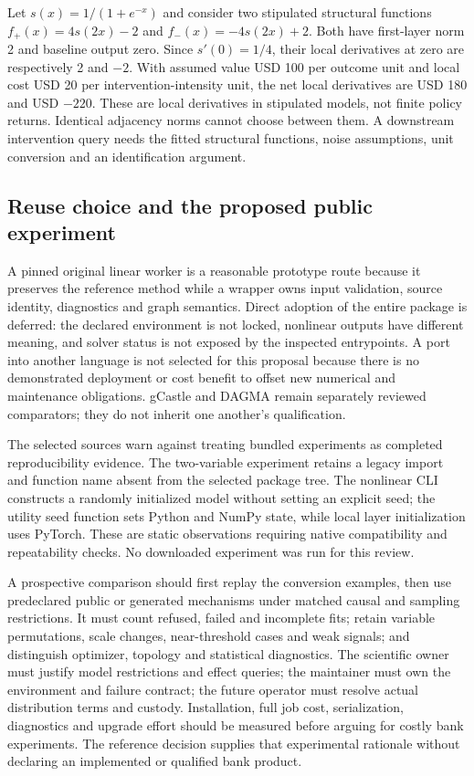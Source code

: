Let $s(x)=1/(1+e^{-x})$ and consider two stipulated structural functions
$f_+(x)=4s(2x)-2$ and $f_-(x)=-4s(2x)+2$.
Both have first-layer norm 2 and baseline output zero. Since $s'(0)=1/4$,
their local derivatives at zero are respectively 2 and $-2$.
With assumed value USD 100 per outcome unit and local cost USD 20 per
intervention-intensity unit, the net local derivatives are USD 180 and
USD $-220$. These are local derivatives in stipulated models, not finite
policy returns. Identical adjacency norms cannot choose between them.
A downstream intervention query needs the fitted structural functions,
noise assumptions, unit conversion and an identification argument.
\citep{exec23_notears_reference}

\subsection{Reuse choice and the proposed public experiment}
\label{exec23:notears-choice}
A pinned original linear worker is a reasonable prototype route because it
preserves the reference method while a wrapper owns input validation, source
identity, diagnostics and graph semantics. Direct adoption of the entire
package is deferred: the declared environment is not locked, nonlinear outputs
have different meaning, and solver status is not exposed by the inspected
entrypoints. A port into another language is not selected for this proposal
because there is no demonstrated deployment or cost benefit to offset new
numerical and maintenance obligations. gCastle and DAGMA remain separately
reviewed comparators; they do not inherit one another's qualification.
\citep{exec23_notears_source,exec20_gcastle_source,exec16_dagma_primary}

The selected sources warn against treating bundled experiments as completed
reproducibility evidence. The two-variable experiment retains a legacy import
and function name absent from the selected package tree. The nonlinear CLI
constructs a randomly initialized model without setting an explicit seed;
the utility seed function sets Python and NumPy state, while local layer
initialization uses PyTorch. These are static observations requiring native
compatibility and repeatability checks. No downloaded experiment was run
for this review.\citep{exec23_notears_source}

A prospective comparison should first replay the conversion examples, then
use predeclared public or generated mechanisms under matched causal and
sampling restrictions. It must count refused, failed and incomplete fits;
retain variable permutations, scale changes, near-threshold cases and weak
signals; and distinguish optimizer, topology and statistical diagnostics.
The scientific owner must justify model restrictions and effect queries; the
maintainer must own the environment and failure contract; the future operator
must resolve actual distribution terms and custody. Installation, full job
cost, serialization, diagnostics and upgrade effort should be measured before
arguing for costly bank experiments. The reference decision supplies that
experimental rationale without declaring an implemented or qualified bank
product.\citep{exec23_notears_source,exec23_notears_reference}
